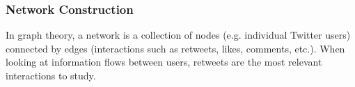 


            
            \subsubsection{Network Construction }\label{third_meth_gene}\label{subsec_meth_net}
            
            In graph theory, a network is a collection of nodes (e.g. individual Twitter users) connected by edges (interactions such as retweets, likes, comments, etc.). When looking at information flows between users, retweets are the most relevant interactions to study.
            
            
            
            
